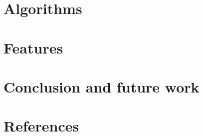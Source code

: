 \documentclass{article}
\begin{document}

\section{Algorithms}


\section{Features}


\section{Conclusion and future work}

\section{References}
\end{document}
